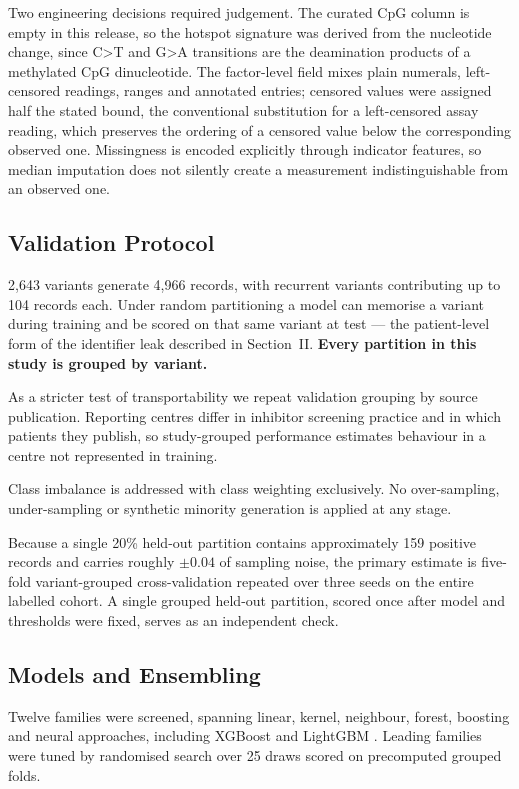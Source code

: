 \documentclass[conference]{IEEEtran}
\begin{document}
Two engineering decisions required judgement. The curated CpG column is empty
in this release, so the hotspot signature was derived from the nucleotide
change, since C\textgreater T and G\textgreater A transitions are the
deamination products of a methylated CpG dinucleotide. The factor-level field
mixes plain numerals, left-censored readings, ranges and annotated entries;
censored values were assigned half the stated bound, the conventional
substitution for a left-censored assay reading, which preserves the ordering of
a censored value below the corresponding observed one. Missingness is encoded
explicitly through indicator features, so median imputation does not silently
create a measurement indistinguishable from an observed one.

\subsection{Validation Protocol}
2{,}643 variants generate 4{,}966 records, with recurrent variants contributing
up to 104 records each. Under random partitioning a model can memorise a
variant during training and be scored on that same variant at test --- the
patient-level form of the identifier leak described in Section~II.
\textbf{Every partition in this study is grouped by variant.}

As a stricter test of transportability we repeat validation grouping by source
publication. Reporting centres differ in inhibitor screening practice and in
which patients they publish, so study-grouped performance estimates behaviour
in a centre not represented in training.

Class imbalance is addressed with class weighting exclusively. No
over-sampling, under-sampling or synthetic minority generation is applied at
any stage.

Because a single 20\% held-out partition contains approximately 159 positive
records and carries roughly $\pm 0.04$ of sampling noise, the primary estimate
is five-fold variant-grouped cross-validation repeated over three seeds on the
entire labelled cohort. A single grouped held-out partition, scored once after
model and thresholds were fixed, serves as an independent check.

\subsection{Models and Ensembling}
Twelve families were screened, spanning linear, kernel, neighbour, forest,
boosting and neural approaches, including XGBoost \cite{xgboost} and LightGBM
\cite{lightgbm}. Leading families were tuned by randomised search over 25 draws
scored on precomputed grouped folds.
\end{document}
